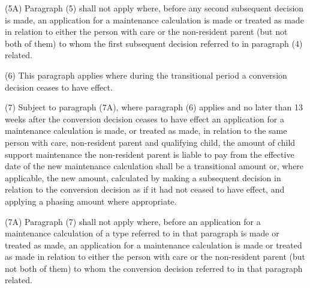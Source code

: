 \documentclass[12pt,a4paper]{article}
\begin{document}
(5A) Paragraph (5) shall not apply where, before any second subsequent decision is made, an application for a maintenance calculation is made or treated as made in relation to either the person with care or the non-resident parent (but not both of them) to whom the first subsequent decision referred to in paragraph (4) related.

(6) This paragraph applies where during the transitional period a 
conversion decision  %
ceases to have effect.

(7) 
Subject to paragraph (7A), where  %
paragraph (6) applies and no later than 13 weeks after the 
conversion decision  %
ceases to have effect 
an application for a maintenance calculation  %
is made, or treated as made, in relation to the same person with care, non-resident parent and qualifying child, the amount of child support maintenance the non-resident parent is liable to pay from the effective date of the new maintenance calculation shall be a transitional amount or, where applicable, the new amount, calculated by making a subsequent decision in relation to the 
conversion decision  %
as if it had not ceased to have effect, and applying a phasing amount where appropriate.

(7A) Paragraph (7) shall not apply where, before an application for a maintenance calculation of a type referred to in that paragraph is made or treated as made, an application for a maintenance calculation is made or treated as made in relation to either the person with care or the non-resident parent (but not both of them) to whom the 
conversion decision  %
referred to in that paragraph related.
\end{document}
